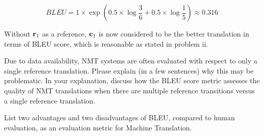 \begin{parts}
\begin{subparts}
{\begin{enumerate}[label=(\alph*)]
            $$
                BLEU = 1 \times \exp(0.5 \times \log{\frac{3}{6}} + 0.5 \times \log{\frac{1}{5}}) \approx 0.316
            $$
            
            \end{enumerate}

            Without $\mathbf{r}_1$ as a reference, $\mathbf{c}_1$ is now considered to be the better translation in terms of BLEU score, which is reasonable as stated in problem ii.
        }
        
        
        
        \subpart[2] Due to data availability, NMT systems are often evaluated with respect to only a single reference translation. Please explain (in a few sentences) why this may be problematic. In your explanation, discuss how the BLEU score metric assesses the quality of NMT translations when there are multiple reference transitions versus a single reference translation.

        
        
        \subpart[2] List two advantages and two disadvantages of BLEU, compared to human evaluation, as an evaluation metric for Machine Translation. 


\end{subparts}
\end{parts}

